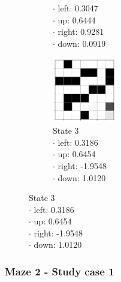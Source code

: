 \documentclass[a4paper]{article}    %
\begin{document}
\begin{figure}[H]
\begin{subfigure}{0.24\textwidth}
{            \hspace*{5mm} $\boldsymbol{\cdot}$ left:  0.3047 \\
            \hspace*{5mm} $\boldsymbol{\cdot}$ up:    0.6444 \\
            \hspace*{5mm} $\boldsymbol{\cdot}$ right: 0.9281 \\
            \hspace*{5mm} $\boldsymbol{\cdot}$ down:  0.0919 }
        \label{fig:maze1-case2-state2}
    \end{subfigure}
    \hfill
    \begin{subfigure}{0.24\textwidth}
        \centering
        \includegraphics[width=2.8cm]{maze1-case2-state3}
        \caption{State 3 \\
            \scriptsize
            \hspace*{5mm} $\boldsymbol{\cdot}$ left:   0.3186 \\
            \hspace*{5mm} $\boldsymbol{\cdot}$ up:     0.6454 \\
            \hspace*{5mm} $\boldsymbol{\cdot}$ right: -1.9548 \\
            \hspace*{5mm} $\boldsymbol{\cdot}$ down:   1.0120 }
        \label{fig:maze1-case2-state3}
    \end{subfigure}
\end{figure}

\subsubsection{Maze 2 - Study case 1}
\end{document}
